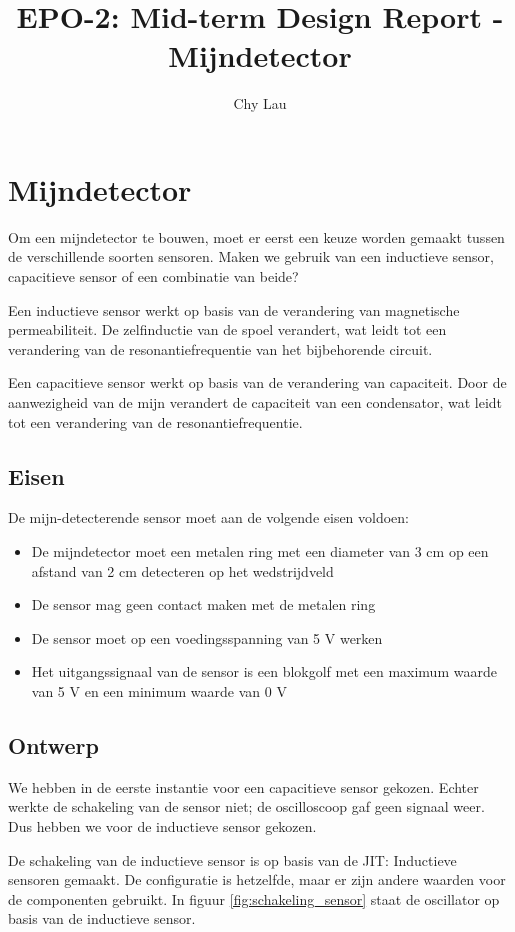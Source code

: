 \documentclass{report}
\title{EPO-2: Mid-term Design Report - Mijndetector}
\author{Chy Lau}
\begin{document}
\chapter{Mijndetector}
\label{ch:mijn}
Om een mijndetector te bouwen, moet er eerst een keuze worden gemaakt tussen de verschillende soorten sensoren. Maken we gebruik van een inductieve sensor, capacitieve sensor of een combinatie van beide? 

Een inductieve sensor werkt op basis van de verandering van magnetische permeabiliteit. De zelfinductie van de spoel verandert, wat leidt tot een verandering van de resonantiefrequentie van het bijbehorende circuit.

Een capacitieve sensor werkt op basis van de verandering van capaciteit. Door de aanwezigheid van de mijn verandert de capaciteit van een condensator, wat leidt tot een verandering van de resonantiefrequentie. 

\section{Eisen}
\label{sec:eisen}
De mijn-detecterende sensor moet aan de volgende eisen voldoen: 
\begin{itemize}
\item De mijndetector moet een metalen ring met een diameter van 3 cm op een afstand van 2 cm detecteren op het wedstrijdveld
\item De sensor mag geen contact maken met de metalen ring
\item De sensor moet op een voedingsspanning van 5 V werken
\item Het uitgangssignaal van de sensor is een blokgolf met een maximum waarde van 5 V en een minimum waarde van 0 V
\end{itemize}

\section{Ontwerp}
\label{sec:ontwerp}
We hebben in de eerste instantie voor een capacitieve sensor gekozen. Echter werkte de schakeling van de sensor niet; de oscilloscoop gaf geen signaal weer. Dus hebben we voor de inductieve sensor gekozen.

De schakeling van de inductieve sensor is op basis van de JIT: Inductieve sensoren gemaakt. De configuratie is hetzelfde, maar er zijn andere waarden voor de componenten gebruikt. In figuur \ref{fig:schakeling_sensor} staat de oscillator op basis van de inductieve sensor.
\end{document}
